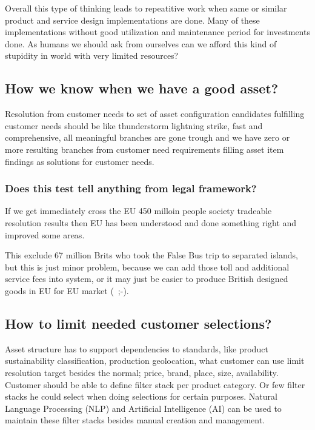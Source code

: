 Overall this type of thinking leads to repeatitive work when same or similar
product and service design implementations are done. Many of these
implementations without good utilization and maintenance period for
investments done. As humans we should ask from ourselves can we afford this
kind of stupidity in world with very limited resources?

\subsection{How we know when we have a good asset?}
\label{asset_goodness}
Resolution from customer needs to set of asset configuration candidates
fulfilling customer needs should be like thunderstorm lightning
strike\allowbreak\cite{LightningStrike}, fast and comprehensive, all
meaningful branches are gone trough and we have zero or more resulting
branches from customer need requirements filling asset item
findings as solutions for customer
needs\allowbreak\cite{Sijoituskasti_Inka_Mero_JulkisenSektorinEhostaminen}.
\subsubsection{Does this test tell anything from legal framework?}
If we get immediately cross the EU 450 milloin people society tradeable
resolution results then EU has been understood and done something
right\allowbreak\cite{YleMorningOneEuIncEtc}\allowbreak\cite{
EUCustomsDataHub}\allowbreak\cite{EUDIW}\allowbreak\cite{
Sijoituskasti_Inka_Mero_LuottamusPaattajiin}\allowbreak\cite{
DayTax}\allowbreak\cite{ContributeToTheVolunteerWork} and improved some
areas\allowbreak\cite{BookEntry}\allowbreak\cite{
LEX_2017/384}\allowbreak\cite{EU_Settlement}\allowbreak\cite{
TEM_2022_9}\allowbreak\cite{
E-003469_2026_ASW}\allowbreak\cite{AiHype202608020700}.

This exclude 67 million Brits who took the False Bus\allowbreak\cite{
BrexitBus} trip to separated islands, but this is just minor
problem\allowbreak\cite{StubbChathamSpeech}, because we can add those
toll and additional service fees into system\allowbreak\cite{SmartBorder2},
or it may just be easier to produce British designed goods in EU for EU
market\allowbreak\cite{EFRC_EU_20260621} (~;-).

\subsection{How to limit needed customer selections?}
\label{asset_search}
Asset structure has to support dependencies to standards, like product
sustainability classification, production geolocation, what customer can use
limit resolution target besides the normal; price, brand, place, size,
availability. Customer should be able to define filter stack per product
category. Or few filter stacks he could select when doing selections for
certain purposes. Natural Language Processing (NLP) and Artificial
Intelligence (AI) can be used to maintain these filter stacks besides manual
creation and management\allowbreak\cite{JollaPhone}\allowbreak\cite{
Creoir}\allowbreak\cite{AIGFNorthern}.


